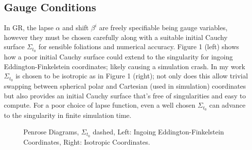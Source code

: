\documentclass[11pt, oneside]{report}  %
\numberwithin{equation}{section}
\begin{document}
\subsection{Gauge Conditions}
In GR, the lapse $\alpha$ and shift $\beta^i$ are freely specifiable being gauge variables, however they must be chosen carefully along with a suitable initial Cauchy surface $\Sigma_{t_0}$ for sensible foliations and numerical accuracy. Figure 1 (left) shows how a poor initial Cauchy surface could extend to the singularity for ingoing Eddington-Finkelstein coordinates; likely causing a simulation crash. In my work $\Sigma_{t_0}$ is chosen to be isotropic as in Figure 1 (right); not only does this allow trivial swapping between spherical polar and Cartesian (used in simulation) coordinates but also provides an initial Cauchy surface that's free of singularities and easy to compute. For a poor choice of lapse function, even a well chosen $\Sigma_{t_0}$ can advance to the singularity in finite simulation time.
  \begin{figure}[h]
  \caption{Penrose Diagrams, $\Sigma_{t_0}$ dashed, Left: Ingoing Eddington-Finkelstein Coordinates, Right: Isotropic Coordinates.}
  \centering
  \hfill
\end{figure}
\end{document}
